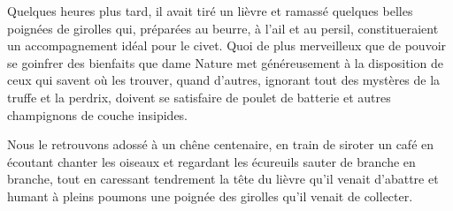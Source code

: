 Quelques heures plus tard, il avait tiré un lièvre et ramassé quelques belles poignées de girolles qui, préparées au beurre, à l’ail et au persil, constitueraient un accompagnement idéal pour le civet. Quoi de plus merveilleux que de pouvoir se goinfrer des bienfaits que dame Nature met généreusement à la disposition de ceux qui savent où les trouver, quand d’autres, ignorant tout des mystères de la truffe et la perdrix, doivent se satisfaire de poulet de batterie et autres champignons de couche insipides.

Nous le retrouvons adossé à un chêne centenaire, en train de siroter un café en écoutant chanter les oiseaux et regardant les écureuils sauter de branche en branche, tout en caressant tendrement la tête du lièvre qu’il venait d’abattre et humant à pleins poumons une poignée des girolles qu’il venait de collecter.

